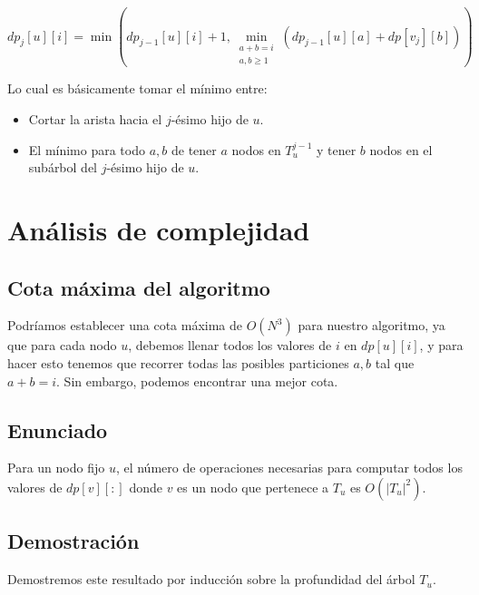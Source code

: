 \[
dp_j[u][i] = \min \left( dp_{j-1}[u][i] + 1, \min_{\substack{a+b=i \\  a, b \geq 1}} (dp_{j-1}[u][a] + dp[v_j][b]) \right)
\]

Lo cual es básicamente tomar el mínimo entre: 
\begin{itemize}
    \item Cortar la arista hacia el $j$-ésimo hijo de $u$. 
    \item El mínimo para todo $a, b$ de tener $a$ nodos en $T_u^{j-1}$ y tener $b$ nodos en el subárbol del $j$-ésimo hijo de $u$.
\end{itemize}

\section{Análisis de complejidad}

\subsection{Cota máxima del algoritmo}

Podríamos establecer una cota máxima de $O(N^3)$ para nuestro algoritmo, ya que para cada nodo $u$,
debemos llenar todos los valores de $i$ en $dp[u][i]$, y para hacer esto tenemos que recorrer todas las posibles
particiones $a, b$ tal que $a + b = i$. Sin embargo, podemos encontrar una mejor cota.

\subsection{Enunciado}

Para un nodo fijo $u$, el número de operaciones necesarias para computar todos los valores de 
$dp[v][:]$ donde $v$ es un nodo que pertenece a $T_u$ es $O(|T_u|^2)$.

\subsection{Demostración}

Demostremos este resultado por inducción sobre la profundidad del árbol $T_u$. 

